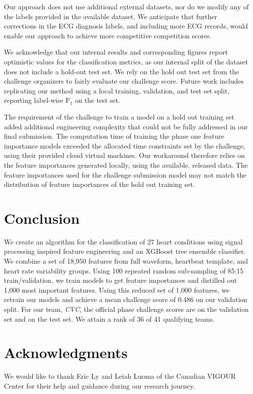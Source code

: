 \documentclass[\main/thesis.tex]{subfiles}
\begin{document}
Our approach does not use additional external datasets, nor do we modify any of the labels provided in the available dataset.
We anticipate that further corrections in the ECG diagnosis labels, and including more ECG records, would enable our approach to achieve more competitive competition scores.

We acknowledge that our internal results and corresponding figures report optimistic values for the classification metrics, as our internal split of the dataset does not include a hold-out test set.
We rely on the hold out test set from the challenge organizers to fairly evaluate our challenge score.
Future work includes replicating our method using a local training, validation, and test set split, reporting label-wise $\text{F}_1$ on the test set.

The requirement of the challenge to train a model on a hold out training set added additional engineering complexity that could not be fully addressed in our final submission.
The computation time of training the phase one feature importance models exceeded the allocated time constraints set by the challenge, using their provided cloud virtual machines.
Our workaround therefore relies on the feature importances generated locally, using the available, released data.
The feature importances used for the challenge submission model may not match the distribution of feature importances of the hold out training set.

\section{Conclusion}

We create an algorithm for the classification of 27 heart conditions using signal processing inspired feature engineering and an XGBoost tree ensemble classifier.
We combine a set of 18,950 features from full waveform, heartbeat template, and heart rate variability groups.
Using 100 repeated random sub-sampling of 85:15 train/validation, we train models to get feature importances and distilled out 1,000 most important features.
Using this reduced set of 1,000 features, we retrain our models and achieve a mean challenge score of 0.486 on our validation split.
For our team, \emph{CVC}, the official phase challenge scores are \officialvalscore on the validation set and \officialtestscore on the test set.
We attain a rank of 36 of 41 qualifying teams.

\section*{Acknowledgments}
We would like to thank Eric Ly and Leiah Luoma of the Canadian VIGOUR Center for their help and guidance during our research journey.
\end{document}
